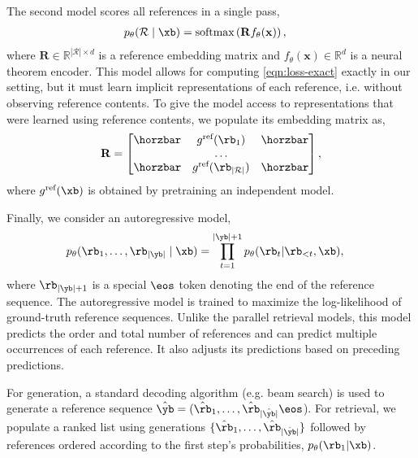 The second model scores all references in a single pass,
\begin{align}
    p_{\theta}(\mathcal{R}\mid \xb) &= \text{softmax}\left(\mathbf{R}f_{\theta}(\mathbf{x})\right),
\end{align}
where $\mathbf{R}\in \mathbb{R}^{|\mathcal{R}|\times d}$ is a reference embedding matrix and $f_{\theta}(\mathbf{x})\in \mathbb{R}^d$ is a neural theorem encoder.
This model allows for computing \autoref{eqn:loss-exact} exactly in our setting, 
but it must learn implicit representations of each reference, i.e. without observing reference contents.
To give the model access to representations that were learned using reference contents, we populate its embedding matrix as,
\begin{align}
\label{eqn:rmatrix}
    \mathbf{R}=\begin{bmatrix}
         \horzbar & g^{\text{ref}}(\rb_1) & \horzbar\\
         &\ldots &\\
         \horzbar & g^{\text{ref}}(\rb_{|\mathcal{R}|}) & \horzbar\\
\end{bmatrix},
\end{align} 
where $g^{\text{ref}}(\xb)$ is obtained by pretraining an independent model. 

Finally, we consider an autoregressive model,
\begin{align}
\label{eqn:autoreg}
    p_{\theta}(\rb_1,\ldots,\rb_{|\yb|}\mid\xb) &= \prod_{t=1}^{|\yb|+1}p_{\theta}(\rb_t|\rb_{<t}, \xb),
\end{align}
where $\rb_{|\yb|+1}$ is a special $\eos$ token denoting the end of the reference sequence.
The autoregressive model is trained to maximize the log-likelihood of ground-truth reference sequences.
Unlike the parallel retrieval models, this model predicts the order and total number of references and can predict multiple occurrences of each reference. It also adjusts its predictions based on preceding predictions.

For generation, a standard decoding algorithm (e.g. beam search) is used to generate a reference sequence $\hat{\yb}=(\hat{\rb}_1,\ldots,\hat{\rb}_{|\hat{\yb}|}\eos$).
For retrieval, we populate a ranked list using generations $\{\hat{\rb}_1,\ldots,\hat{\rb}_{|\hat{\yb}|}\}$ followed by references ordered according to the first step's probabilities, $p_{\theta}(\rb_{1}|\xb)$.

